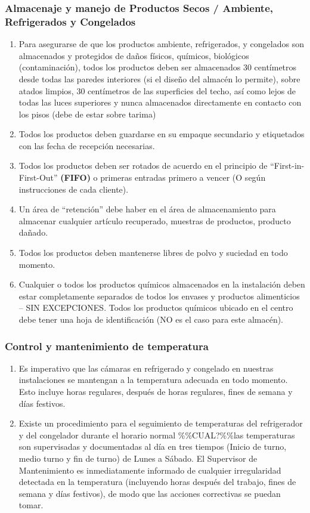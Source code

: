\subsubsection{Almacenaje y manejo de Productos Secos / Ambiente, Refrigerados y Congelados}

\begin{enumerate}
	\item Para asegurarse de que los productos ambiente, refrigerados, y congelados son almacenados y protegidos de daños físicos, químicos, biológicos (contaminación), todos los productos deben ser almacenados 30 centímetros desde todas las paredes interiores (si el diseño del almacén lo permite), sobre atados limpios, 30 centímetros de las superficies del techo, así como lejos de todas las luces superiores y nunca almacenados directamente en contacto con los pisos (debe de estar sobre tarima)
	\item Todos los productos deben guardarse en su empaque secundario y etiquetados con las fecha de recepción necesarias.
	\item Todos los productos deben ser rotados de acuerdo en el principio de “First-in-First-Out” \textbf{(FIFO)} o primeras entradas primero a vencer (O según instrucciones de cada cliente).
	\item Un área de “retención” debe haber en el área de almacenamiento para almacenar cualquier artículo recuperado, muestras de productos, producto dañado.
	\item Todos los productos deben mantenerse libres de polvo y suciedad en todo momento.
	\item Cualquier o todos los productos químicos almacenados en la instalación deben estar completamente separados de todos los envases y productos alimenticios – SIN EXCEPCIONES. Todos los productos químicos ubicado en el centro debe tener una hoja de identificación (NO es el caso para este almacén).
\end{enumerate}

\subsubsection{Control y mantenimiento de temperatura}

\begin{enumerate}
	\item Es imperativo que las cámaras en refrigerado y congelado en nuestras instalaciones se mantengan a la temperatura adecuada en todo momento. Esto incluye horas regulares, después de horas regulares, fines de semana y días festivos.
	\item Existe un procedimiento para el seguimiento de temperaturas del refrigerador y del congelador durante el horario normal \%\%CUAL?\%\%las temperaturas son supervisadas y documentadas al día en tres tiempos (Inicio de turno, medio turno y fin de turno) de Lunes a Sábado. El Supervisor de Mantenimiento es inmediatamente informado de cualquier irregularidad detectada en la temperatura (incluyendo horas después del trabajo, fines de semana y días festivos), de modo que las acciones correctivas se puedan tomar.
\end{enumerate}


